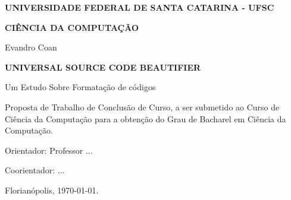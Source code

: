 \documentclass[12pt]{article}
\newcommand{\Title}[1]{\textbf{\MakeUppercase{#1}}}
\begin{document}
\begin{titlepage}

    \center

    \Title{Universidade Federal de Santa Catarina - UFSC}

    \Title{Ciência Da Computação}


    Evandro Coan


    \Title{Universal Source Code Beautifier}

    \bigskip
    Um Estudo Sobre Formatação de códigos\\[3cm]

    \begin{flushright}

        \begin{minipage}{0.518\textwidth}

            Proposta de Trabalho de Conclusão de Curso,
            a ser submetido ao Curso de Ciência da Computação
            para a obtenção do Grau de Bacharel em Ciência da Computação.

            \medskip
            Orientador: Professor ...

            \medskip
            Coorientador: ...

        \end{minipage}

    \end{flushright}


    Florianópolis, \today.

\end{titlepage}
\end{document}
